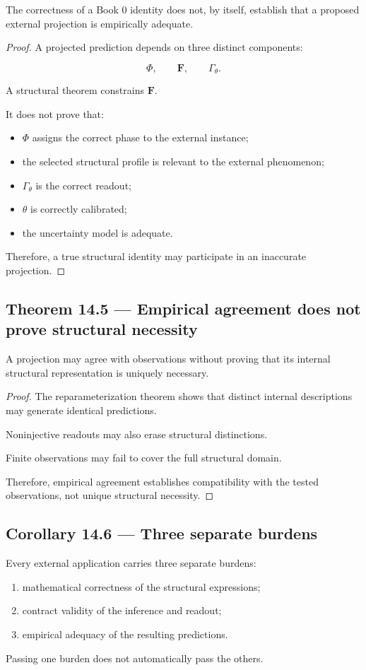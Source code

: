 \documentclass[11pt,oneside,openany]{book}
\newcommand{\PCsubsection}[1]{%
  \subsection*{#1}%
}
\begin{document}
The correctness of a Book 0 identity does not, by itself, establish that a proposed external projection is empirically adequate.

\begin{proof}
A projected prediction depends on three distinct components:

\[
\Phi, \qquad \mathbf F, \qquad \Gamma_\theta.
\]

A structural theorem constrains \(\mathbf F\).

It does not prove that:

\begin{itemize}
\item \(\Phi\) assigns the correct phase to the external instance;
\item the selected structural profile is relevant to the external phenomenon;
\item \(\Gamma_\theta\) is the correct readout;
\item \(\theta\) is correctly calibrated;
\item the uncertainty model is adequate.
\end{itemize}
Therefore, a true structural identity may participate in an inaccurate projection.

\end{proof}

\PCsubsection{Theorem 14.5 --- Empirical agreement does not prove structural necessity}

A projection may agree with observations without proving that its internal structural representation is uniquely necessary.

\begin{proof}
The reparameterization theorem shows that distinct internal descriptions may generate identical predictions.

Noninjective readouts may also erase structural distinctions.

Finite observations may fail to cover the full structural domain.

Therefore, empirical agreement establishes compatibility with the tested observations, not unique structural necessity.

\end{proof}

\PCsubsection{Corollary 14.6 --- Three separate burdens}

Every external application carries three separate burdens:

\begin{enumerate}
\item mathematical correctness of the structural expressions;
\item contract validity of the inference and readout;
\item empirical adequacy of the resulting predictions.
\end{enumerate}
Passing one burden does not automatically pass the others.
\end{document}

